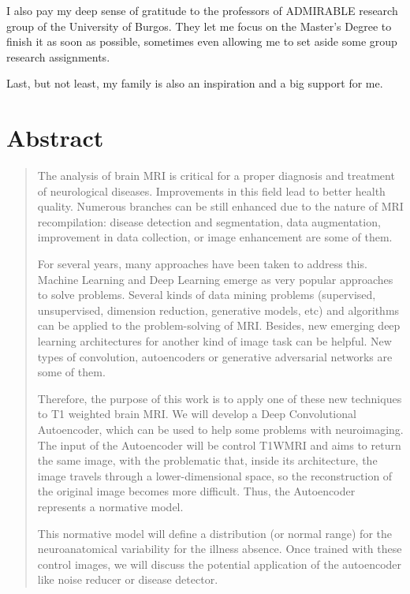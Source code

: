 I also pay my deep sense of gratitude to the professors of ADMIRABLE research group of the University of Burgos. They let me focus on the Master's Degree to finish it as soon as possible, sometimes even allowing me to set aside some group research assignments.

Last, but not least, my family is also an inspiration and a big support for me.


\chapter*{\centering Abstract}

\onehalfspacing

\begin{quote}
{The analysis of brain MRI is critical for a proper diagnosis and treatment of neurological diseases. Improvements in this field lead to better health quality. Numerous branches can be still enhanced due to the nature of MRI recompilation: disease detection and segmentation, data augmentation, improvement in data collection, or image enhancement are some of them.

For several years, many approaches have been taken to address this. Machine Learning and Deep Learning emerge as very popular approaches to solve problems. Several kinds of data mining problems (supervised, unsupervised, dimension reduction, generative models, etc) and algorithms can be applied to the problem-solving of MRI. Besides, new emerging deep learning architectures for another kind of image task can be helpful. New types of convolution, autoencoders or generative adversarial networks are some of them.

Therefore, the purpose of this work is to apply one of these new techniques to T1 weighted brain MRI. We will develop a Deep Convolutional Autoencoder, which can be used to help some problems with neuroimaging. The input of the Autoencoder will be control T1WMRI and aims to return the same image, with the problematic that, inside its architecture, the image travels through a lower-dimensional space, so the reconstruction of the original image becomes more difficult. Thus, the Autoencoder represents a normative model.

This normative model will define a distribution (or normal range) for the neuroanatomical variability for the illness absence. Once trained with these control images, we will discuss the potential application of the autoencoder like noise reducer or disease detector.}
\end{quote}

